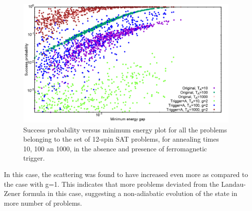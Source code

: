 \documentclass[../main.tex]{subfiles}
\begin{document}
\begin{figure}[H]
\centering 
\includegraphics[scale=0.3]{SuccVsGap_OA_g2.png}
\caption{Success probability versus minimum energy plot for all the problems belonging to the set of 12-spin SAT problems, for annealing times 10, 100 an 1000, in the absence and presence of ferromagnetic trigger.}
\label{fig:a42}
\end{figure}

In this case, the scattering was found to have increased even more as compared to the case with g=1. This indicates that more problems deviated from the Landau-Zener formula in this case, suggesting a non-adiabatic evolution of the state in more number of problems.
\end{document}
